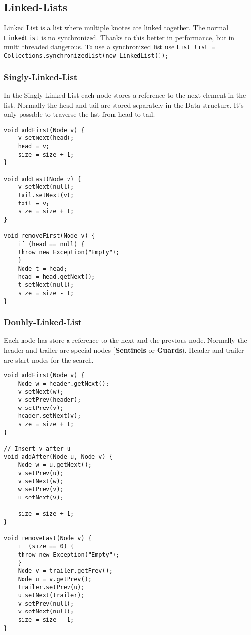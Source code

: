 \documentclass[11pt,twoside,landscape]{article}
\begin{document}
\begin{multicols}{2}
\subsection*{Linked-Lists}
\label{sec:org98d4408}
Linked List is a list where multiple knotes are linked together. The normal \texttt{LinkedList} is no synchronized. Thanks to this better in performance, but in multi threaded dangerous. To use a synchronized list use \texttt{List list = Collections.synchronizedList(new LinkedList());}

\subsubsection*{Singly-Linked-List}
\label{sec:orga6666c1}
In the Singly-Linked-List each node stores a reference to the next element in the list. Normally the head and tail are stored separately in the Data structure. It's only possible to traverse the list from head to tail.
\begin{verbatim}
void addFirst(Node v) {
    v.setNext(head);
    head = v;
    size = size + 1;
}

void addLast(Node v) {
    v.setNext(null);
    tail.setNext(v);
    tail = v;
    size = size + 1;
}

void removeFirst(Node v) {
    if (head == null) {
	throw new Exception("Empty");
    }
    Node t = head;
    head = head.getNext();
    t.setNext(null);
    size = size - 1;
}
\end{verbatim}

\subsubsection*{Doubly-Linked-List}
\label{sec:org77de6ea}
Each node has store a reference to the next and the previous node. Normally the header and trailer are special nodes (\textbf{Sentinels} or \textbf{Guards}). Header and trailer are start nodes for the search.
\begin{verbatim}
void addFirst(Node v) {
    Node w = header.getNext();
    v.setNext(w);
    v.setPrev(header);
    w.setPrev(v);
    header.setNext(v);
    size = size + 1;
}

// Insert v after u
void addAfter(Node u, Node v) { 
    Node w = u.getNext();
    v.setPrev(u);
    v.setNext(w);
    w.setPrev(v);
    u.setNext(v);

    size = size + 1;
}

void removeLast(Node v) {
    if (size == 0) {
	throw new Exception("Empty");
    }
    Node v = trailer.getPrev();
    Node u = v.getPrev();
    trailer.setPrev(u);
    u.setNext(trailer);
    v.setPrev(null);
    v.setNext(null);
    size = size - 1;
}


\end{verbatim}
\end{multicols}
\end{document}
